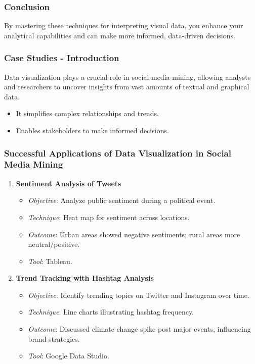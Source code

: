 \documentclass{beamer}
\begin{document}
\begin{frame}[fragile]
    \frametitle{Conclusion}
    By mastering these techniques for interpreting visual data, you enhance your analytical capabilities 
    and can make more informed, data-driven decisions.
\end{frame}

\begin{frame}[fragile]
    \frametitle{Case Studies - Introduction}
    Data visualization plays a crucial role in social media mining, allowing analysts and researchers to uncover insights from vast amounts of textual and graphical data. 
    \begin{itemize}
        \item It simplifies complex relationships and trends.
        \item Enables stakeholders to make informed decisions.
    \end{itemize}
\end{frame}

\begin{frame}[fragile]
    \frametitle{Successful Applications of Data Visualization in Social Media Mining}
    \begin{enumerate}
        \item \textbf{Sentiment Analysis of Tweets}
        \begin{itemize}
            \item \textit{Objective}: Analyze public sentiment during a political event.
            \item \textit{Technique}: Heat map for sentiment across locations.
            \item \textit{Outcome}: Urban areas showed negative sentiments; rural areas more neutral/positive.
            \item \textit{Tool}: Tableau.
        \end{itemize}
        
        \item \textbf{Trend Tracking with Hashtag Analysis}
        \begin{itemize}
            \item \textit{Objective}: Identify trending topics on Twitter and Instagram over time.
            \item \textit{Technique}: Line charts illustrating hashtag frequency.
            \item \textit{Outcome}: Discussed climate change spike post major events, influencing brand strategies.
            \item \textit{Tool}: Google Data Studio.
        \end{itemize}
    \end{enumerate}
\end{frame}
\end{document}
